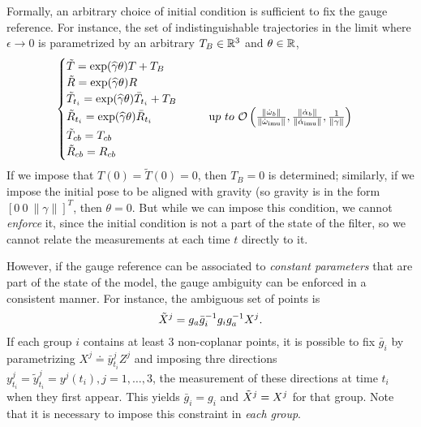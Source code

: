 Formally, an arbitrary choice of initial condition is sufficient to fix the gauge reference. 
For instance, the set of indistinguishable trajectories in the limit where $\epsilon \rightarrow 0$ is parametrized by an arbitrary $T_B\in \mathbb{R}^3$ and $\theta \in \mathbb{R}$, 
\begin{equation}
\begin{cases}
\tilde T =  \exp(\widehat \gamma \theta) T + T_B   \\
\tilde R = \exp(\widehat \gamma \theta) R   \\ 
\tilde T_{t_i} = \exp(\widehat \gamma \theta) \bar T_{t_i} + T_B \\
\tilde R_{t_i} = \exp(\widehat \gamma \theta) \bar R_{t_i}  ~~~~~~~~~~~~~~~ {\mathrm up \ to \ } {\mathcal O}\left( \frac{\| \dot {\omega}_b \|}{\|\dot {\omega}_\mathrm{imu}  \|}, \frac{\| \dot \alpha_b \|}{\|\dot \alpha_\mathrm{imu} \|},  \frac{1}{\| \gamma \|} \right)  \\
\tilde T_{cb} = T_{cb}  \\
\tilde R_{cb} = R_{cb}   
\end{cases}
\label{eq-obs-zeroinput}
\end{equation}
If we impose that $T(0) = \tilde T(0) = 0$, then $T_B = 0$ is determined; similarly, if we impose the initial pose to be aligned with gravity (so gravity is in the form $[0 \ 0 \ \| \gamma \| ]^T$, then $\theta = 0$. 
But while we can impose this condition, we cannot {\em enforce} it, since the initial condition is not a part of the state of the filter, so we cannot relate the measurements at each time $t$ directly to it.

However, if the gauge reference can be associated to {\em constant parameters} that are part of the state of the model, the gauge ambiguity can be enforced in a consistent manner. For instance, the ambiguous set of points is
\begin{equation}
\tilde{X}^j = g_a \bar g_i^{-1} g_i g_a^{-1} X^j.
\end{equation}
If each group $i$ contains at least $3$ non-coplanar points, it is possible to fix $\bar g_i$ by parametrizing $X^j \doteq \bar y^j_{t_i} Z^j$ and imposing thre directions $y^j_{t_i} = {\tilde y}^j_{t_i} = y^j(t_i), j = 1, \dots, 3$, the measurement of these directions at time $t_i$ when they first appear. 
This yields $\bar g_i = g_i$ and $\tilde{X}^j = X^j$ for that group. Note that it is necessary to impose this constraint in {\em each group}.

